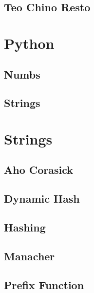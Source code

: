 \documentclass[9pt,portrait,twocolumn,a4paper,notitlepage]{article}
\newcommand\cppfile[2][]{%
\ifstrempty{#1}{}{}%
}
\newcommand\pythonfile[2][]{%
\ifstrempty{#1}{}{}%
}
\begin{document}
\subsection{Teo Chino Resto}
\cppfile{number_theory_clean/teo_chino_resto.cpp}


\section{Python}

\subsection{Numbs}
\pythonfile{Python_clean/numbs.py}

\subsection{Strings}
\pythonfile{Python_clean/strings.py}


\section{Strings}

\subsection{Aho Corasick}
\cppfile{strings_clean/aho_corasick.cpp}

\subsection{Dynamic Hash}
\cppfile{strings_clean/dynamic_Hash.cpp}

\subsection{Hashing}
\cppfile{strings_clean/hashing.cpp}

\subsection{Manacher}
\cppfile{strings_clean/manacher.cpp}

\subsection{Prefix Function}
\cppfile{strings_clean/prefix_function.cpp}
\end{document}
